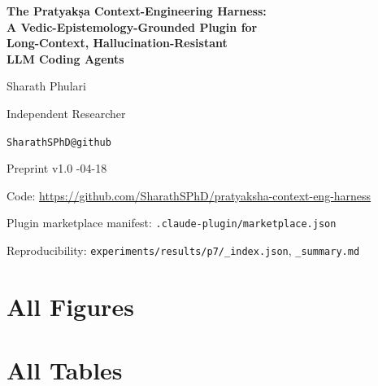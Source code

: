 \documentclass[11pt,a4paper]{article}
\begin{document}
\begin{titlepage}
\begin{center}
\vspace*{2cm}
{\LARGE\bfseries The Pratyak\d{s}a Context-Engineering Harness:\\
A Vedic-Epistemology-Grounded Plugin for\\
Long-Context, Hallucination-Resistant\\
LLM Coding Agents\par}
\vspace{1.5cm}
{\large Sharath Phulari\par}
{\normalsize Independent Researcher\par}
{\normalsize \texttt{SharathSPhD@github}\par}
\vfill
{\small Preprint v1.0 \quad\textbar{}-04-18\par}
\vspace{0.5cm}
{\small Code: \url{https://github.com/SharathSPhD/pratyaksha-context-eng-harness}\par}
{\small Plugin marketplace manifest: \texttt{.claude-plugin/marketplace.json}\par}
{\small Reproducibility: \texttt{experiments/results/p7/\_index.json}, \texttt{\_summary.md}\par}
\end{center}
\end{titlepage}


\clearpage
\tableofcontents
\clearpage














\clearpage
\appendix








\clearpage
\section*{All Figures}


\clearpage
\section*{All Tables}


\clearpage

\end{document}
